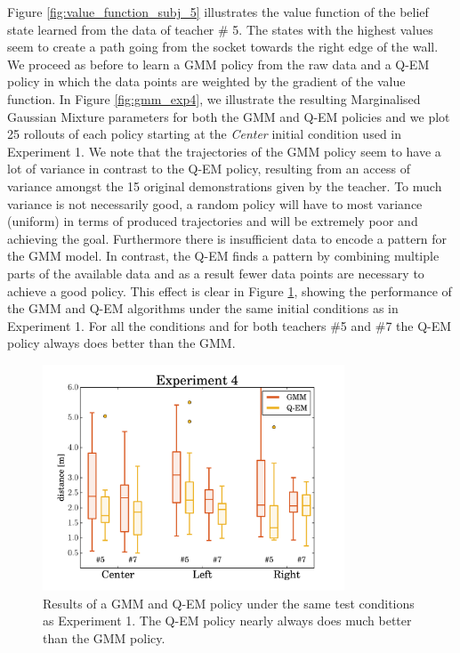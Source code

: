 Figure \ref{fig:value_function_subj_5} illustrates the value function of the belief state learned from the data of teacher \# 5.
The states with the highest values seem to create a path going from the socket towards the right edge of the wall. 
We proceed as before to learn a GMM policy from the raw data and a Q-EM policy in which the data points are weighted by 
the gradient of the value function. In Figure \ref{fig:gmm_exp4}, we illustrate the 
resulting Marginalised Gaussian Mixture parameters for both the GMM and Q-EM policies and we plot 25 rollouts of each policy starting at 
the \textit{Center} initial condition used in Experiment 1. We note that the trajectories of the GMM 
policy seem to have a lot of variance in contrast to the Q-EM policy, resulting from an access of variance amongst the 15 original demonstrations
given by the teacher. To much variance is not necessarily good, a random policy will have to most variance (uniform) in terms of produced trajectories
and will be extremely poor and achieving the goal. Furthermore there is insufficient data to encode a pattern for the GMM model. In contrast, the Q-EM finds a 
pattern by combining multiple parts of the available data and as a result fewer data points are necessary to achieve a good policy. 
This effect is clear in Figure \ref{fig:experiment4_stats}, showing the performance of the GMM and Q-EM algorithms 
under the same initial conditions as in Experiment 1. For all the conditions and for both teachers \#5 and \#7 the Q-EM policy 
always does better than the GMM.

\begin{figure}
 \centering
 \includegraphics[width=0.8\textwidth]{./ch4-PiH/Figures/Fig/experiment4.pdf}
 \caption{Results of a GMM and Q-EM policy under the same test conditions as Experiment 1. The Q-EM policy nearly always does much better than the GMM policy.}
 \label{fig:experiment4_stats}
\end{figure}

